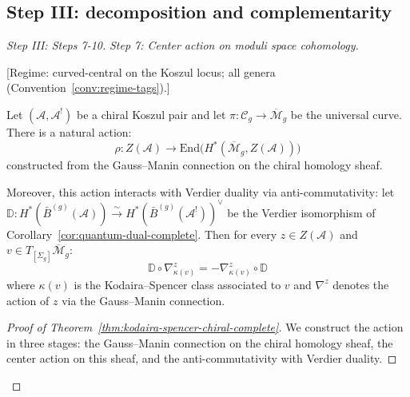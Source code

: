 \subsection{Step III: decomposition and complementarity}

\begin{proof}[Step III: Steps 7-10]

\emph{Step 7: Center action on moduli space cohomology.}

\begin{theorem}
\label{thm:kodaira-spencer-chiral-complete}
\textup{[Regime: curved-central on the Koszul locus; all genera
\textup{(}Convention~\textup{\ref{conv:regime-tags})}.]}

Let $(\mathcal{A}, \mathcal{A}^!)$ be a chiral Koszul pair and let $\pi: \mathcal{C}_g
\to \overline{\mathcal{M}}_g$ be the universal curve.  There is a natural action:
\begin{equation}
\rho: Z(\mathcal{A}) \to \mathrm{End}\bigl(H^*(\overline{\mathcal{M}}_g, Z(\mathcal{A}))\bigr)
\end{equation}
constructed from the Gauss--Manin connection on the chiral homology sheaf.

Moreover, this action interacts with Verdier duality via anti-commutativity: let
$\mathbb{D}: H^*(\bar{B}^{(g)}(\mathcal{A})) \xrightarrow{\sim} H^*(\bar{B}^{(g)}(
\mathcal{A}^!))^\vee$ be the Verdier isomorphism of Corollary~\ref{cor:quantum-dual-complete}.
Then for every $z \in Z(\mathcal{A})$ and $v \in T_{[\Sigma_g]}\overline{\mathcal{M}}_g$:
\begin{equation}\label{eq:verdier-ks-anticommute}
\mathbb{D} \circ \nabla_{\kappa(v)}^z = -\nabla_{\kappa(v)}^z \circ \mathbb{D}
\end{equation}
where $\kappa(v)$ is the Kodaira--Spencer class associated to $v$ and $\nabla^z$
denotes the action of $z$ via the Gauss--Manin connection.
\end{theorem}

\begin{proof}[Proof of Theorem~\ref{thm:kodaira-spencer-chiral-complete}]
We construct the action in three stages: the Gauss--Manin connection on the chiral
homology sheaf, the center action on this sheaf, and the anti-commutativity with
Verdier duality.


\end{proof}
\end{proof}
